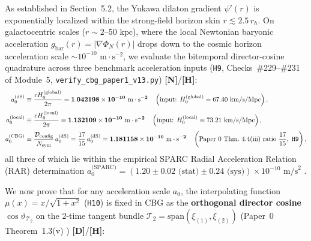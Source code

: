 \documentclass[11pt,a4paper]{article}
\newcommand{\catD}{\textbf{\textcolor{blue!75!black}{[D]}}}
\newcommand{\catH}{\textbf{\textcolor{orange!85!black}{[H]}}}
\newcommand{\catN}{\textbf{\textcolor{teal!75!black}{[N]}}}
\theoremstyle{definition}
\theoremstyle{remark}
\begin{document}
As established in Section~5.2, the Yukawa dilaton gradient $\psi'(r)$ is exponentially localized within the strong-field horizon skin $r \lesssim 2.5\,r_h$. On galactocentric scales ($r \sim 2\text{--}50\text{ kpc}$), where the local Newtonian baryonic acceleration $g_{\text{bar}}(r) = |\nabla\Phi_N(r)|$ drops down to the cosmic horizon acceleration scale $\sim 10^{-10}\text{ m}\cdot\text{s}^{-2}$, we evaluate the bitemporal director-cosine quadrature across three benchmark acceleration inputs (\texttt{H9}, Checks~\#229--\#231 of Module~5, \texttt{verify\_cbg\_paper1\_v13.py}) \catN/\catH:
\begin{align}
  a_0^{\text{(dS)}} &\equiv \frac{c H_0^{\text{(global)}}}{2\pi} = \mathbf{1.042198 \times 10^{-10}\text{ m}\cdot\text{s}^{-2}} \quad \left(\text{input: } H_0^{\text{(global)}} = 67.40\text{ km/s/Mpc}\right), \nonumber \\[3pt]
  a_0^{\text{(local)}} &\equiv \frac{c H_0^{\text{(local)}}}{2\pi} = \mathbf{1.132109 \times 10^{-10}\text{ m}\cdot\text{s}^{-2}} \quad \left(\text{input: } H_0^{\text{(local)}} = 73.21\text{ km/s/Mpc}\right), \nonumber \\[3pt]
  a_0^{\text{(CBG)}} &\equiv \frac{\mathcal{D}_{\text{config}}}{N_{\text{sym}}}\,a_0^{\text{(dS)}} = \frac{17}{15}\,a_0^{\text{(dS)}} = \mathbf{1.181158 \times 10^{-10}\text{ m}\cdot\text{s}^{-2}} \quad \left(\text{Paper~0 Thm.~4.4(iii) ratio } \frac{17}{15}, \text{ \texttt{H9}}\right),
  \label{eq:a0_dual_definitions}
\end{align}
all three of which lie within the empirical SPARC Radial Acceleration Relation (RAR) determination $a_0^{\text{(SPARC)}} = (1.20 \pm 0.02\text{ (stat)} \pm 0.24\text{ (sys)}) \times 10^{-10}\text{ m/s}^2$ \cite{McGaugh2016}.

We now prove that for any acceleration scale $a_0$, the interpolating function $\mu(x) = x/\sqrt{1 + x^2}$ (\texttt{H10}) is fixed in CBG as the \textbf{orthogonal director cosine $\cos\vartheta_{\mathcal{T}_2}$} on the 2-time tangent bundle $\mathcal{T}_2 = \text{span}(\xi_{(1)}, \xi_{(2)})$ (Paper~0 Theorem~1.3(v) \cite{JV_Paper0}) \catD/\catH:
\end{document}
